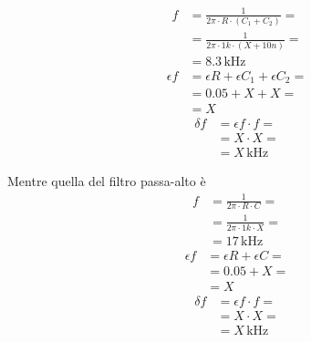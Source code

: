 \documentclass{article}
\begin{document}
			\begin{minipage}[t]{0.5\textwidth}
				\begin{equation*}
					\begin{split}
						f &= \frac{1}{2 \pi \cdot R \cdot (C_{1} + C_{2})} = \\
						  &= \frac{1}{2 \pi \cdot 1k \cdot (X + 10n)} = \\
						  &= 8.3 \, \mathrm{kHz}
					\end{split}
				\end{equation*}
				\newline
				\begin{equation*}
					\begin{split}
						\epsilon f &= \epsilon R + \epsilon C_{1} + \epsilon C_{2} = \\
								   &= 0.05 + X + X = \\
								   &= X
					\end{split}
				\end{equation*}
				\newline
				\begin{equation*}
					\begin{split}
						\delta f &= \epsilon f \cdot f = \\
								 &= X \cdot X = \\
								 &= X \, \mathrm{kHz}
					\end{split}
				\end{equation*}
			\end{minipage}
			Mentre quella del filtro passa-alto è
			\begin{equation*}
				\begin{split}
					f &= \frac{1}{2 \pi \cdot R \cdot C} = \\
					  &= \frac{1}{2 \pi \cdot 1k \cdot X} = \\
					  &= 17 \, \mathrm{kHz}
				\end{split}
			\end{equation*}
			\newline
			\begin{equation*}
				\begin{split}
					\epsilon f &= \epsilon R + \epsilon C = \\
							   &= 0.05 + X = \\
							   &= X
				\end{split}
			\end{equation*}
			\newline
			\begin{equation*}
				\begin{split}
					\delta f &= \epsilon f \cdot f = \\
							 &= X \cdot X = \\
							 &= X \, \mathrm{kHz}
				\end{split}
			\end{equation*}
\end{document}
